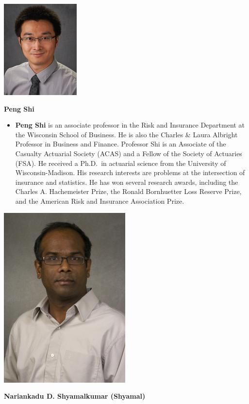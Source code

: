 \documentclass[
  12pt,
  krantz2]{Format/krantzNoCorner}
\providecommand{\tightlist}{%
  \setlength{\itemsep}{0pt}\setlength{\parskip}{0pt}}
\begin{document}
\begin{center}\includegraphics[width=0.2\linewidth,height=0.3\textheight]{ContributorPics/Shi_Peng_150x188} \end{center}

\begin{center}
\textbf{ Peng Shi }
\end{center}

\begin{itemize}
\tightlist
\item
  \textbf{Peng Shi} is an associate professor in the Risk and Insurance Department at the Wisconsin School of Business. He is also the Charles \& Laura Albright Professor in Business and Finance. Professor Shi is an Associate of the Casualty Actuarial Society (ACAS) and a Fellow of the Society of Actuaries (FSA). He received a Ph.D.~in actuarial science from the University of Wisconsin-Madison. His research interests are problems at the intersection of insurance and statistics. He has won several research awards, including the Charles A. Hachemeister Prize, the Ronald Bornhuetter Loss Reserve Prize, and the American Risk and Insurance Association Prize.
\end{itemize}

\newpage

\begin{center}\includegraphics[width=0.2\linewidth,height=0.3\textheight]{ContributorPics/Shyamal} \end{center}

\begin{center}
\textbf{ Nariankadu D. Shyamalkumar (Shyamal) }
\end{center}
\end{document}
